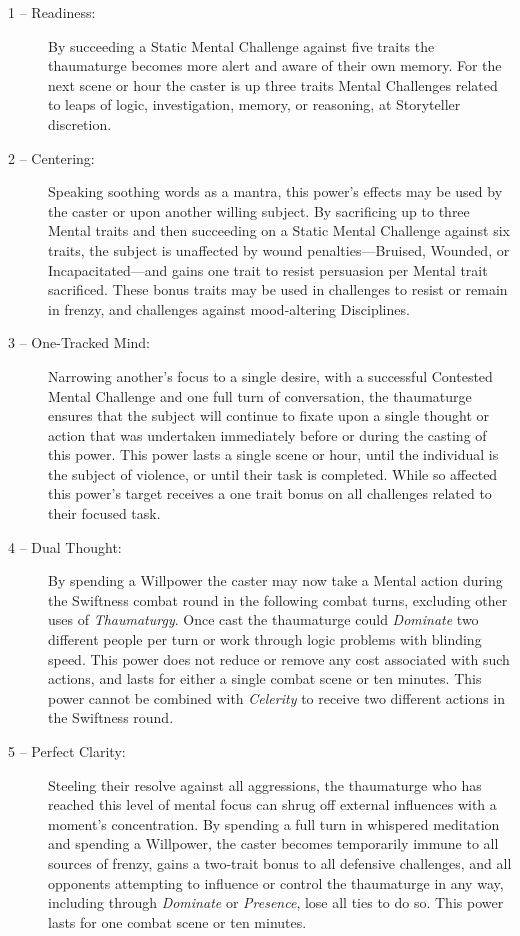 \begin{description}
	\item[1 -- Readiness:]  By succeeding a Static Mental Challenge against five traits the thaumaturge becomes more alert 
	and aware of their own memory.  For the next scene or hour the caster is up three traits Mental Challenges related to 
	leaps of logic, investigation, memory, or reasoning, at Storyteller discretion.
	\item[2 -- Centering:]  Speaking soothing words as a mantra, this power's effects may be used by the caster or upon 
	another willing subject.  By sacrificing up to three Mental traits and then succeeding on a Static Mental Challenge 
	against six traits, the subject is unaffected by wound penalties---Bruised, Wounded, or Incapacitated---and gains one 
	trait to resist persuasion per Mental trait sacrificed.  These bonus traits may be used in challenges to resist or 
	remain in frenzy, and challenges against mood-altering Disciplines.
	\item[3 -- One-Tracked Mind:]  Narrowing another's focus to a single desire, with a successful Contested Mental 
	Challenge and one full turn of conversation, the thaumaturge ensures that the subject will continue to fixate upon a 
	single thought or action that was undertaken immediately before or during the casting of this power.  This power lasts 
	a single scene or hour, until the individual is the subject of violence, or until their task is completed.  While so 
	affected this power's target receives a one trait bonus on all challenges related to their focused task.
	\item[4 -- Dual Thought:]  By spending a Willpower the caster may now take a Mental action during the Swiftness 
	combat round in the following combat turns, excluding other uses of \emph{Thaumaturgy}.  Once cast the thaumaturge 
	could \emph{Dominate} two different people per turn or work through logic problems with blinding speed.  This power 
	does not reduce or remove any cost associated with such actions, and lasts for either a single combat scene or ten minutes.  
	This power cannot be combined with \emph{Celerity} to receive two different actions in the Swiftness round.
	\item[5 -- Perfect Clarity:]  Steeling their resolve against all aggressions, the thaumaturge who has reached this level 
	of mental focus can shrug off external influences with a moment's concentration.  By spending a full turn in whispered 
	meditation and spending a Willpower, the caster becomes temporarily immune to all sources of frenzy, gains a 
	two-trait bonus to all defensive challenges, and all opponents attempting to influence or control the thaumaturge in any way, 
	including through \emph{Dominate} or \emph{Presence}, lose all ties to do so.  This power lasts for one combat scene 
	or ten minutes.
\end{description}

